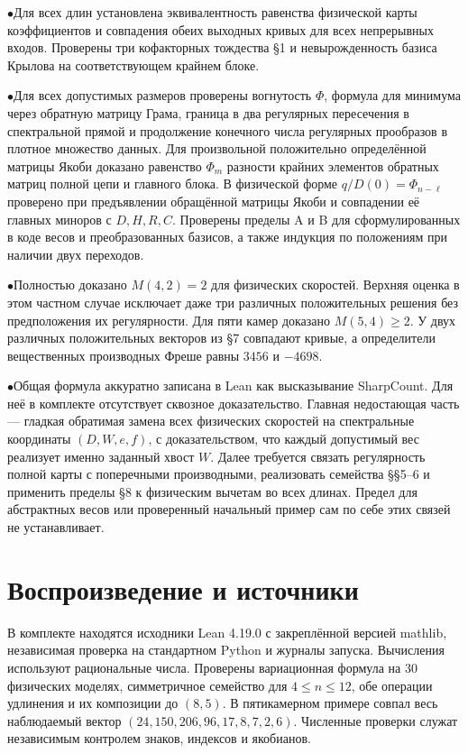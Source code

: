 \documentclass[12pt,a4paper]{article}
\begin{document}
\par\noindent\(\bullet\)\enspace Для всех длин установлена эквивалентность равенства физической карты коэффициентов и совпадения обеих выходных кривых для всех непрерывных входов. Проверены три кофакторных тождества §1 и невырожденность базиса Крылова на соответствующем крайнем блоке.
\par\noindent\(\bullet\)\enspace Для всех допустимых размеров проверены вогнутость \(\Phi\), формула для минимума через обратную матрицу Грама, граница в два регулярных пересечения в спектральной прямой и продолжение конечного числа регулярных прообразов в плотное множество данных. Для произвольной положительно определённой матрицы Якоби доказано равенство \(\Phi_m\) разности крайних элементов обратных матриц полной цепи и главного блока. В физической форме \(q/D(0)=\Phi_{n-\ell}\) проверено при предъявлении обращённой матрицы Якоби и совпадении её главных миноров с \(D,H,R,C\). Проверены пределы A и B для сформулированных в коде весов и преобразованных базисов, а также индукция по положениям при наличии двух переходов.
\par\noindent\(\bullet\)\enspace Полностью доказано \(M(4,2)=2\) для физических скоростей. Верхняя оценка в этом частном случае исключает даже три различных положительных решения без предположения их регулярности. Для пяти камер доказано \(M(5,4)\ge2\). У двух различных положительных векторов из §7 совпадают кривые, а определители вещественных производных Фреше равны \(3456\) и \(-4698\).
\par\noindent\(\bullet\)\enspace Общая формула аккуратно записана в Lean как высказывание SharpCount. Для неё в комплекте отсутствует сквозное доказательство. Главная недостающая часть — гладкая обратимая замена всех физических скоростей на спектральные координаты \((D,W,e,f)\), с доказательством, что каждый допустимый вес реализует именно заданный хвост \(W\). Далее требуется связать регулярность полной карты с поперечными производными, реализовать семейства §§5–6 и применить пределы §8 к физическим вычетам во всех длинах. Предел для абстрактных весов или проверенный начальный пример сам по себе этих связей не устанавливает.

\section*{\color{ink} Воспроизведение и источники}

В комплекте находятся исходники Lean 4.19.0 с закреплённой версией mathlib, независимая проверка на стандартном Python и журналы запуска. Вычисления используют рациональные числа. Проверены вариационная формула на 30 физических моделях, симметричное семейство для \(4\le n\le12\), обе операции удлинения и их композиции до \((8,5)\). В пятикамерном примере совпал весь наблюдаемый вектор \((24,150,206,96,17,8,7,2,6)\). Численные проверки служат независимым контролем знаков, индексов и якобианов.
\end{document}
